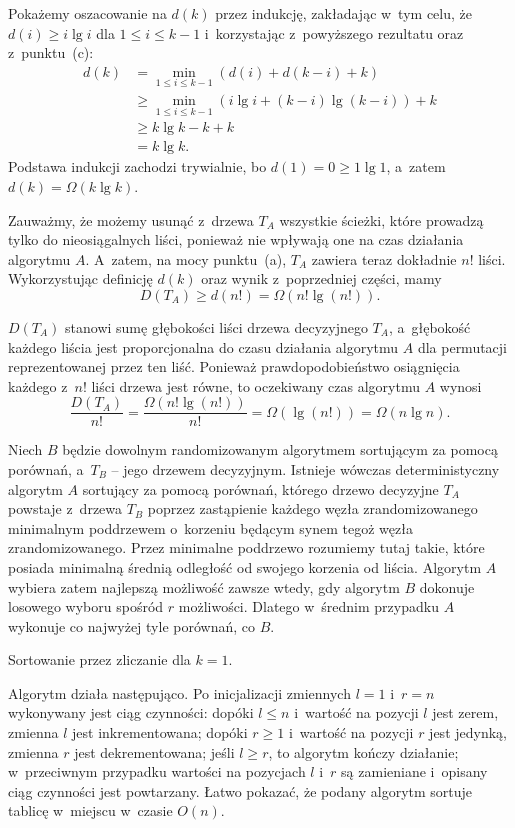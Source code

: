 Pokażemy oszacowanie na $d(k)$ przez indukcję, zakładając w~tym celu, że $d(i)\ge i\lg i$ dla $1\le i\le k-1$ i~korzystając z~powyższego rezultatu oraz z~punktu~(c):
\begin{align*}
	d(k) &= \min_{1\le i\le k-1}(d(i)+d(k-i)+k) \\
	&\ge \min_{1\le i\le k-1}(i\lg i+(k-i)\lg(k-i))+k \\
	&\ge k\lg k-k+k \\
	&= k\lg k.
\end{align*}
Podstawa indukcji zachodzi trywialnie, bo $d(1)=0\ge 1\lg1$, a~zatem $d(k)=\Omega(k\lg k)$.

\subproblem %
Zauważmy, że możemy usunąć z~drzewa $T_A$ wszystkie ścieżki, które prowadzą tylko do nieosiągalnych liści, ponieważ nie wpływają one na czas działania algorytmu $A$. A~zatem, na mocy punktu~(a), $T_A$ zawiera teraz dokładnie $n!$ liści. Wykorzystując definicję $d(k)$ oraz wynik z~poprzedniej części, mamy
\[
	D(T_A) \ge d(n!) = \Omega(n!\lg(n!)).
\]

$D(T_A)$ stanowi sumę głębokości liści drzewa decyzyjnego $T_A$, a~głębokość każdego liścia jest proporcjonalna do czasu działania algorytmu $A$ dla permutacji reprezentowanej przez ten liść. Ponieważ prawdopodobieństwo osiągnięcia każdego z~$n!$ liści drzewa jest równe, to oczekiwany czas algorytmu $A$ wynosi
\[
	\frac{D(T_A)}{n!} = \frac{\Omega(n!\lg(n!))}{n!} = \Omega(\lg(n!)) = \Omega(n\lg n).
\]

\subproblem %
Niech $B$ będzie dowolnym randomizowanym algorytmem sortującym za pomocą porównań, a~$T_B$ -- jego drzewem decyzyjnym. Istnieje wówczas deterministyczny algorytm $A$ sortujący za pomocą porównań, którego drzewo decyzyjne $T_A$ powstaje z~drzewa $T_B$ poprzez zastąpienie każdego węzła zrandomizowanego minimalnym poddrzewem o~korzeniu będącym synem tegoż węzła zrandomizowanego. Przez minimalne poddrzewo rozumiemy tutaj takie, które posiada minimalną średnią odległość od swojego korzenia od liścia. Algorytm $A$ wybiera zatem najlepszą możliwość zawsze wtedy, gdy algorytm $B$ dokonuje losowego wyboru spośród $r$ możliwości. Dlatego w~średnim przypadku $A$ wykonuje co najwyżej tyle porównań, co $B$.


\subproblem %
Sortowanie przez zliczanie dla $k=1$.

\subproblem %
Algorytm działa następująco. Po inicjalizacji zmiennych $l=1$ i~$r=n$ wykonywany jest ciąg czynności: dopóki $l\le n$ i~wartość na pozycji $l$ jest zerem, zmienna $l$ jest inkrementowana; dopóki $r\ge1$ i~wartość na pozycji $r$ jest jedynką, zmienna $r$ jest dekrementowana; jeśli $l\ge r$, to algorytm kończy działanie; w~przeciwnym przypadku wartości na pozycjach $l$ i~$r$ są zamieniane i~opisany ciąg czynności jest powtarzany. Łatwo pokazać, że podany algorytm sortuje tablicę  w~miejscu w~czasie $O(n)$.

